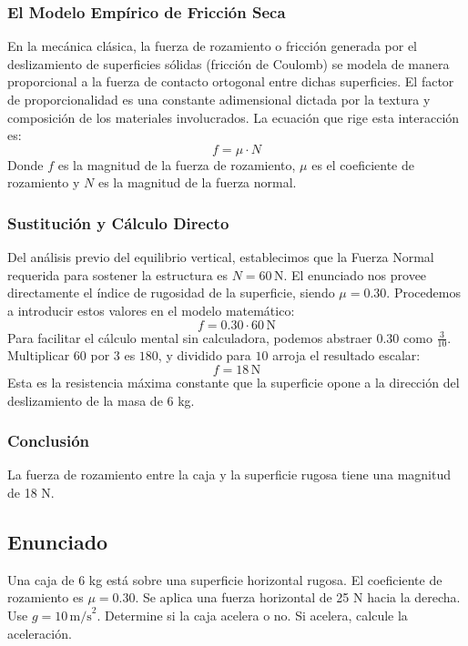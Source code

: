 \documentclass[12pt]{article}
\begin{document}
\subsubsection*{El Modelo Empírico de Fricción Seca}
En la mecánica clásica, la fuerza de rozamiento o fricción generada por el deslizamiento de superficies sólidas (fricción de Coulomb) se modela de manera proporcional a la fuerza de contacto ortogonal entre dichas superficies. El factor de proporcionalidad es una constante adimensional dictada por la textura y composición de los materiales involucrados.
La ecuación que rige esta interacción es:
\begin{equation}
    f = \mu \cdot N
\end{equation}
Donde $f$ es la magnitud de la fuerza de rozamiento, $\mu$ es el coeficiente de rozamiento y $N$ es la magnitud de la fuerza normal.

\subsubsection*{Sustitución y Cálculo Directo}
Del análisis previo del equilibrio vertical, establecimos que la Fuerza Normal requerida para sostener la estructura es $N = 60 \, \text{N}$. El enunciado nos provee directamente el índice de rugosidad de la superficie, siendo $\mu = 0.30$. 
Procedemos a introducir estos valores en el modelo matemático:
\begin{equation}
    f = 0.30 \cdot 60 \, \text{N}
\end{equation}
Para facilitar el cálculo mental sin calculadora, podemos abstraer $0.30$ como $\frac{3}{10}$. Multiplicar $60$ por $3$ es $180$, y dividido para $10$ arroja el resultado escalar:
\begin{equation}
    f = 18 \, \text{N}
\end{equation}
Esta es la resistencia máxima constante que la superficie opone a la dirección del deslizamiento de la masa de 6 kg.

\subsubsection*{Conclusión}
La fuerza de rozamiento entre la caja y la superficie rugosa tiene una magnitud de 18 N.

\newpage

\subsection*{Enunciado}
Una caja de 6 kg está sobre una superficie horizontal rugosa. El coeficiente de rozamiento es $\mu = 0.30$. Se aplica una fuerza horizontal de 25 N hacia la derecha. Use $g = 10 \, \text{m/s}^2$. Determine si la caja acelera o no. Si acelera, calcule la aceleración.
\end{document}
